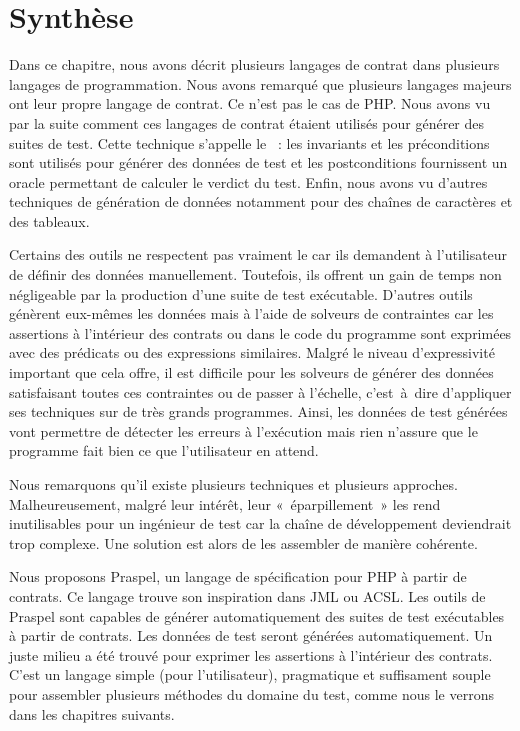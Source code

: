 \section{Synthèse}
\label{section:sota:summary}

Dans ce chapitre, nous avons décrit plusieurs langages de contrat dans plusieurs
langages de programmation. Nous avons remarqué que plusieurs langages majeurs
ont leur propre langage de contrat. Ce n'est pas le cas de PHP. Nous avons vu
par la suite comment ces langages de contrat étaient utilisés pour générer des
suites de test. Cette technique s'appelle le ~: les invariants et les préconditions sont utilisés pour générer des
données de test et les postconditions fournissent un oracle permettant de
calculer le verdict du test. Enfin, nous avons vu d'autres techniques de
génération de données notamment pour des chaînes de caractères et des tableaux.

Certains des outils ne respectent pas vraiment le  car ils demandent à l'utilisateur de définir des données manuellement.
Toutefois, ils offrent un gain de temps non négligeable par la production d'une
suite de test exécutable. D'autres outils génèrent eux-mêmes les données mais à
l'aide de solveurs de contraintes car les assertions à l'intérieur des contrats
ou dans le code du programme sont exprimées avec des prédicats ou des
expressions similaires. Malgré le niveau d'expressivité important que cela
offre, il est difficile pour les solveurs de générer des données satisfaisant
toutes ces contraintes ou de passer à l'échelle, c'est~à~dire d'appliquer ses
techniques sur de très grands programmes. Ainsi, les données de test générées
vont permettre de détecter les erreurs à l'exécution mais rien n'assure que le
programme fait bien ce que l'utilisateur en attend.

Nous remarquons qu'il existe plusieurs techniques et plusieurs approches.
Malheureusement, malgré leur intérêt, leur «~éparpillement~» les rend
inutilisables pour un ingénieur de test car la chaîne de développement
deviendrait trop complexe. Une solution est alors de les assembler de manière
cohérente.

Nous proposons Praspel, un langage de spécification pour PHP à partir de
contrats. Ce langage trouve son inspiration dans JML ou ACSL. Les outils de
Praspel sont capables de générer automatiquement des suites de test exécutables
à partir de contrats. Les données de test seront générées automatiquement. Un
juste milieu a été trouvé pour exprimer les assertions à l'intérieur des
contrats. C'est un langage simple (pour l'utilisateur), pragmatique et
suffisament souple pour assembler plusieurs méthodes du domaine du test, comme
nous le verrons dans les chapitres suivants.
